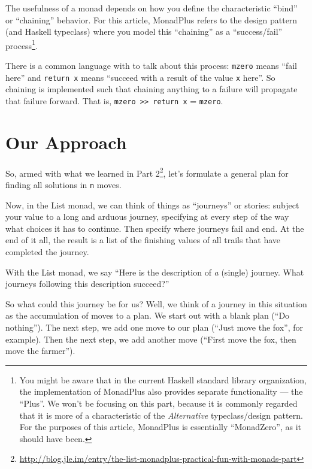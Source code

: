 \documentclass[]{article}
\renewcommand{\href}[2]{#2\footnote{\url{#1}}}
\begin{document}
The usefulness of a monad depends on how you define the characteristic ``bind''
or ``chaining'' behavior. For this article, MonadPlus refers to the design
pattern (and Haskell typeclass) where you model this ``chaining'' as a
``success/fail'' process\footnote{You might be aware that in the current Haskell
  standard library organization, the implementation of MonadPlus also provides
  separate functionality --- the ``Plus''. We won't be focusing on this part,
  because it is commonly regarded that it is more of a characteristic of the
  \emph{Alternative} typeclass/design pattern. For the purposes of this article,
  MonadPlus is essentially ``MonadZero'', as it should have been.}.

There is a common language with to talk about this process: \texttt{mzero} means
``fail here'' and \texttt{return\ x} means ``succeed with a result of the value
\texttt{x} here''. So chaining is implemented such that chaining anything to a
failure will propagate that failure forward. That is,
\texttt{mzero\ \textgreater{}\textgreater{}\ return\ x} = \texttt{mzero}.

\hypertarget{our-approach}{%
\section{Our Approach}\label{our-approach}}

So, armed with what we learned in
\href{http://blog.jle.im/entry/the-list-monadplus-practical-fun-with-monads-part}{Part
2}, let's formulate a general plan for finding all solutions in \texttt{n}
moves.

Now, in the List monad, we can think of things as ``journeys'' or stories:
subject your value to a long and arduous journey, specifying at every step of
the way what choices it has to continue. Then specify where journeys fail and
end. At the end of it all, the result is a list of the finishing values of all
trails that have completed the journey.

With the List monad, we say ``Here is the description of \emph{a} (single)
journey. What journeys following this description succeed?''

So what could this journey be for us? Well, we think of a journey in this
situation as the accumulation of moves to a plan. We start out with a blank plan
(``Do nothing''). The next step, we add one move to our plan (``Just move the
fox'', for example). Then the next step, we add another move (``First move the
fox, then move the farmer'').
\end{document}
